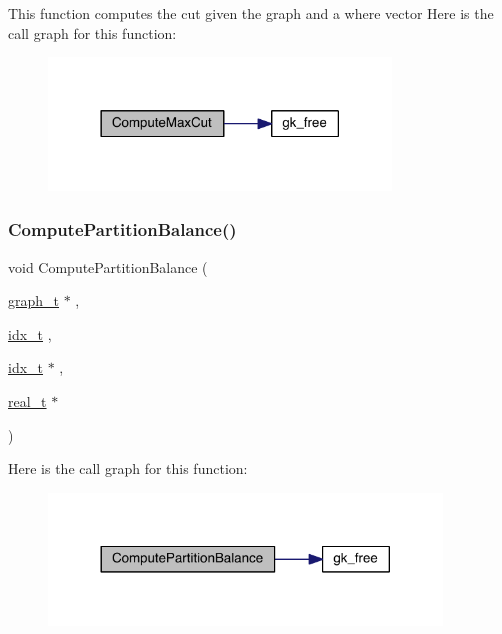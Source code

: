 This function computes the cut given the graph and a where vector Here is the call graph for this function\+:\nopagebreak
\begin{figure}[H]
\begin{center}
\leavevmode
\includegraphics[width=258pt]{a00945_a2c579207b8d0c26ec7e5bebbdceaa73d_cgraph}
\end{center}
\end{figure}
\mbox{\label{a00945_a572c23e7220586baf1ffaaf00eb4d849}} 
\subsubsection{\texorpdfstring{Compute\+Partition\+Balance()}{ComputePartitionBalance()}}
{\footnotesize\ttfamily void Compute\+Partition\+Balance (\begin{DoxyParamCaption}\item[{\hyperlink{a00734}{graph\+\_\+t} $\ast$}]{,  }\item[{\hyperlink{a00876_aaa5262be3e700770163401acb0150f52}{idx\+\_\+t}}]{,  }\item[{\hyperlink{a00876_aaa5262be3e700770163401acb0150f52}{idx\+\_\+t} $\ast$}]{,  }\item[{\hyperlink{a00876_a1924a4f6907cc3833213aba1f07fcbe9}{real\+\_\+t} $\ast$}]{ }\end{DoxyParamCaption})}

Here is the call graph for this function\+:\nopagebreak
\begin{figure}[H]
\begin{center}
\leavevmode
\includegraphics[width=296pt]{a00945_a572c23e7220586baf1ffaaf00eb4d849_cgraph}
\end{center}
\end{figure}
\mbox{\label{a00945_a9d1af3e91b56dfaa4e4f7d4b743b187d}} 
